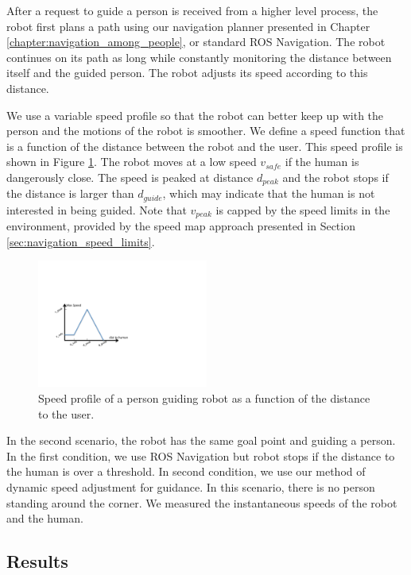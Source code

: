  After a request to guide a person is received from a higher level process, the robot first plans a path using our navigation planner presented in Chapter \ref{chapter:navigation_among_people}, or standard ROS Navigation. The robot continues on its path as long while constantly monitoring the distance between itself and the guided person. The robot adjusts its speed according to this distance.

We use a variable speed profile so that the robot can better keep up with the person and the motions of the robot is smoother. We define a speed function that is a function of the distance between the robot and the user. This speed profile is shown in Figure \ref{fig:guidance_speed_profile}. The robot moves at a low speed $v_{safe}$ if the human is dangerously close. The speed is peaked at distance $d_{peak}$ and the robot stops if the distance is larger than $d_{guide}$, which may indicate that the human is not interested in being guided. Note that $v_{peak}$ is capped by the speed limits in the environment, provided by the speed map approach presented in Section \ref{sec:navigation_speed_limits}.

\begin{figure}[ht!]
\centering
\includegraphics[width=0.5\textwidth]{pics/speed_profile_cropped}
\caption{Speed profile of a person guiding robot as a function of the distance to the user.}
\label{fig:guidance_speed_profile}
\end{figure}

In the second scenario, the robot has the same goal point and guiding a person. In the first condition, we use ROS Navigation but robot stops if the distance to the human is over a threshold. In second condition, we use our method of dynamic speed adjustment for guidance. In this scenario, there is no person standing around the corner. We measured the instantaneous speeds of the robot and the human.


\subsection{Results}
\label{sec:guidance_results}

